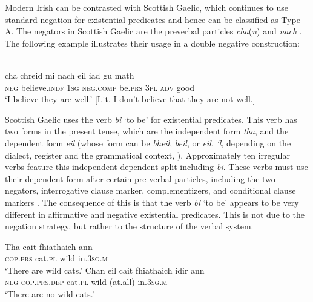 \documentclass[output=paper]{langsci/langscibook}
\begin{document}
Modern Irish can be contrasted with Scottish
Gaelic, which continues to use standard negation for
existential predicates and hence can be classified as Type A. The negators
in Scottish Gaelic are the preverbal particles \textit{cha}(\textit{n}) and \textit{nach} \citep[61]{Lamb2001}. The following example illustrates their usage in a double negative construction:
%
\begin{exe}\ex
{}\\
    \gll cha  chreid mi nach eil iad gu    math \\
\textsc{neg} believe.\textsc{indf} \textsc{1sg} \textsc{neg}.\textsc{comp} be.\textsc{prs} \textsc{3pl} \textsc{adv} good \\
    \glt `I believe they are well.' [Lit. I don’t believe that they are not well.] 
    \end{exe}
%
Scottish Gaelic uses the verb \textit{bi} `to be' for existential
predicates. This verb has two forms in the present tense, which are the
independent form \textit{tha}, and the dependent form \textit{eil} (whose
form can be \textit{bheil}, \textit{beil}, or \textit{eil}, \textit{‘l},
depending on the dialect, register and the grammatical context,
\citealt[54]{Lamb2001}). Approximately ten irregular verbs feature this independent-dependent split including \textit{bi}.  These verbs must use their dependent form after certain pre-verbal particles, including the two negators, interrogative clause marker, complementizers, and conditional clause markers \citep[50]{Lamb2001}. The consequence of this is that the verb \textit{bi} `to be' appears to be very different in affirmative and negative existential predicates. This is not due to the negation strategy, but rather to the structure of the verbal system.
%
\begin{exe}\ex
{}
\begin{xlist}
\ex\gll Tha cait fhiathaich ann \\
\textsc{cop}.\textsc{prs} cat.\textsc{pl} wild in.\textsc{3sg.m} \\
    \glt `There are wild cats.'
\ex\gll Chan eil cait fhiathaich \op{}idir\cp{}   ann\\
    \textsc{neg} \textsc{cop.prs.dep} cat.\textsc{pl} wild (at.all)
    in.\textsc{3sg.m}\\
    \glt `There are no wild cats.'
\end{xlist}\end{exe}
\end{document}
